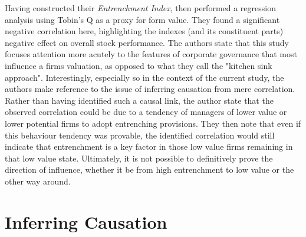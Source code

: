 {{Having constructed their {\it Entrenchment Index}, \cite{bebchukWhatMatters} then performed a regression analysis using Tobin's Q as a proxy for form value. They found a significant negative correlation here, highlighting the indexes (and its constituent parts) negative effect on overall stock performance. The authors state that this study focuses attention more acutely to the features of corporate governance that most influence a firms valuation, as opposed to what they call the "kitchen sink approach". Interestingly, especially so in the context of the current study, the authors make reference to the issue of inferring causation from mere correlation. Rather than having identified such a causal link, the author state that the observed correlation could be due to a tendency of managers of lower value or lower potential firms to adopt entrenching provisions. They then note that even if this behaviour tendency was provable, the identified correlation would still indicate that entrenchment is a key factor in those low value firms remaining in that low value state. Ultimately, it is not possible to definitively prove the direction of influence, whether it be from high entrenchment to low value or the other way around. }
\section{Inferring Causation}\label{InferringCausation}
}
